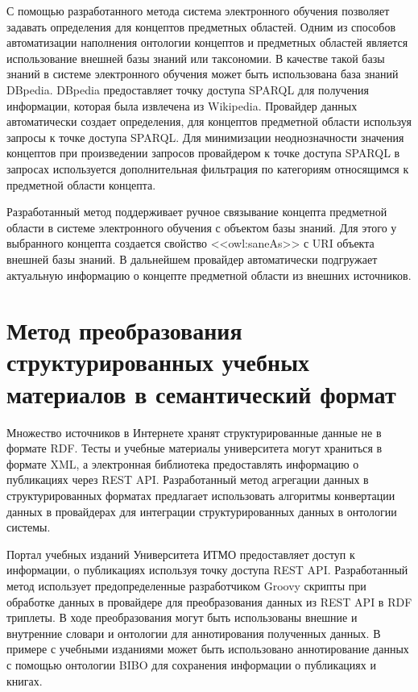 С помощью разработанного метода система электронного обучения позволяет задавать определения для концептов предметных областей. Одним из способов автоматизации наполнения онтологии концептов и предметных областей является использование внешней базы знаний или таксономии. В качестве такой базы знаний в системе электронного обучения может быть использована база знаний DBpedia. DBpedia предоставляет точку доступа SPARQL для получения информации, которая была извлечена из Wikipedia. Провайдер данных автоматически создает определения, для концептов предметной области используя запросы к точке доступа SPARQL. Для минимизации неоднозначности значения концептов при произведении запросов провайдером к точке доступа SPARQL в запросах используется дополнительная фильтрация по категориям относящимся к предметной области концепта. 

Разработанный метод поддерживает ручное связывание концепта предметной области в системе электронного обучения с объектом базы знаний. Для этого у выбранного концепта создается свойство <<owl:saneAs>> с URI объекта внешней базы знаний. В дальнейшем провайдер автоматически подгружает актуальную информацию о концепте предметной области из внешних источников.



\section{Метод преобразования структурированных учебных материалов в семантический формат} \label{sect3_2}

Множество источников в Интернете хранят структурированные данные не в формате RDF. Тесты и учебные материалы университета могут храниться в формате XML, а электронная библиотека предоставлять информацию о публикациях через REST API. Разработанный метод агрегации данных в структурированных форматах предлагает использовать алгоритмы конвертации данных в провайдерах для интеграции структурированных данных в онтологии системы.

Портал учебных изданий Университета ИТМО предоставляет доступ к информации, о публикациях используя точку доступа REST API. Разработанный метод использует предопределенные разработчиком Groovy скрипты при обработке данных в провайдере для преобразования данных из REST API в RDF триплеты. В ходе преобразования могут быть использованы внешние и внутренние словари и онтологии для аннотирования полученных данных. В примере с учебными изданиями может быть использовано аннотирование данных с помощью онтологии BIBO для сохранения информации о публикациях и книгах. 

